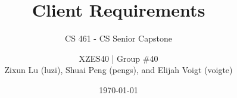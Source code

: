 



\title{Client Requirements}
\subtitle{CS 461 - CS Senior Capstone}
\author{
  XZES40 | Group \#40 \\
  Zixun Lu (luzi),
  Shuai Peng (pengs), and
  Elijah Voigt (voigte)
}
\date{\today}
\maketitle
\begin{abstract}
  
\end{abstract}

\clearpage

%
%
%
%
%
%
%










